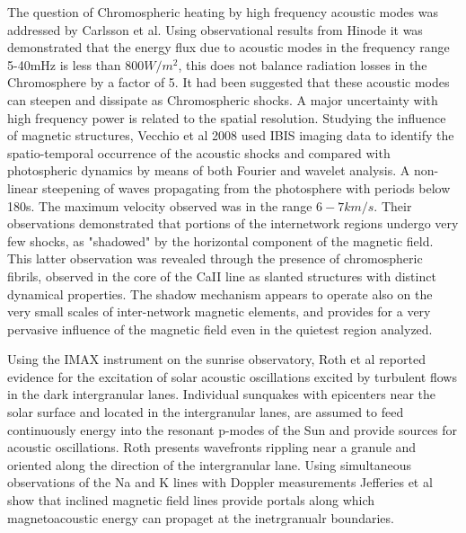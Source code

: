 \documentclass[final,1p]{elsarticle}
\begin{document}
 The question of Chromospheric heating by high frequency acoustic modes was addressed by Carlsson et al\cite{Carlsson2007}. Using observational results from Hinode it was demonstrated that the energy flux due to acoustic modes in the frequency range 5-40mHz is less than $800W/m^2$, this does not balance radiation losses in the Chromosphere by a factor of 5. It had been suggested that these acoustic modes can steepen and dissipate as Chromospheric shocks. A major uncertainty  with high frequency power is related to the spatial resolution. Studying the influence of magnetic structures, Vecchio et al 2008  \cite{Cauzzi2008} used IBIS imaging data to identify the spatio-temporal occurrence of the acoustic shocks and  compared with photospheric dynamics by means of both Fourier and wavelet analysis. A non-linear steepening of waves propagating from the photosphere with periods below 180s. The maximum velocity observed was in the range $6-7km/s$. Their observations demonstrated that portions of the internetwork regions undergo very few shocks, as "shadowed" by the horizontal component of the magnetic field. This latter observation was revealed through the presence of chromospheric fibrils, observed in the core of the CaII line as slanted structures with distinct dynamical properties. The shadow mechanism appears to operate also on the very small scales of inter-network magnetic elements, and provides for a very pervasive influence of the magnetic field even in the quietest region analyzed. 

Using the IMAX instrument on the sunrise observatory, Roth et al  \cite{Roth2010}  reported evidence for the excitation of solar acoustic oscillations excited by turbulent flows  in the dark intergranular lanes.  Individual sunquakes with epicenters near the solar surface and located in the intergranular lanes, are assumed to feed continuously energy into the resonant p-modes of the Sun and provide sources for acoustic oscillations. Roth presents wavefronts rippling near a granule and oriented along the direction of the intergranular lane. Using simultaneous observations of the Na and K lines with Doppler measurements Jefferies et al \cite{Jefferies2006} show that inclined magnetic field lines provide portals along which magnetoacoustic energy can propaget at the inetrgranualr boundaries.
\end{document}
